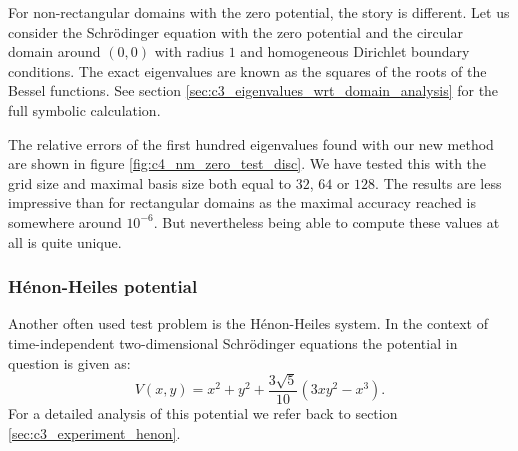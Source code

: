 For non-rectangular domains with the zero potential, the story is different. Let us consider the Schrödinger equation with the zero potential and the circular domain around $(0, 0)$ with radius $1$ and homogeneous Dirichlet boundary conditions. The exact eigenvalues are known as the squares of the roots of the Bessel functions. See section \ref{sec:c3_eigenvalues_wrt_domain_analysis} for the full symbolic calculation.

The relative errors of the first hundred eigenvalues found with our new method are shown in figure \ref{fig:c4_nm_zero_test_disc}. We have tested this with the grid size and maximal basis size both equal to $32$, $64$ or $128$. The results are less impressive than for rectangular domains as the maximal accuracy reached is somewhere around $10^{-6}$. But nevertheless being able to compute these values at all is quite unique.


\subsubsection{Hénon-Heiles potential}\label{sec:c4_numerical_henon_heiles}

Another often used test problem is the Hénon-Heiles system. In the context of time-independent two-dimensional Schrödinger equations the potential in question is given as:
$$
    V(x, y) = x^2 + y^2 + \frac{3\sqrt{5}}{10}(3 x y^2 - x^3)\text{.}
$$
For a detailed analysis of this potential we refer back to section \ref{sec:c3_experiment_henon}.

